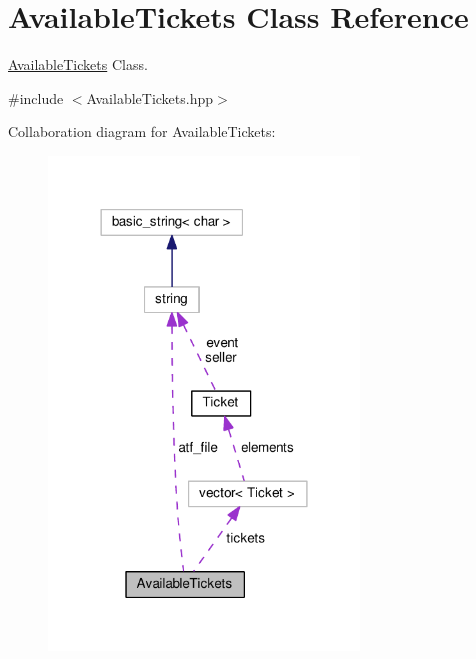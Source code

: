 \hypertarget{class_available_tickets}{\section{Available\-Tickets Class Reference}
\label{class_available_tickets}
}


\hyperlink{class_available_tickets}{Available\-Tickets} Class.  




{\ttfamily \#include $<$Available\-Tickets.\-hpp$>$}



Collaboration diagram for Available\-Tickets\-:\nopagebreak
\begin{figure}[H]
\begin{center}
\leavevmode
\includegraphics[width=234pt]{class_available_tickets__coll__graph}
\end{center}
\end{figure}
